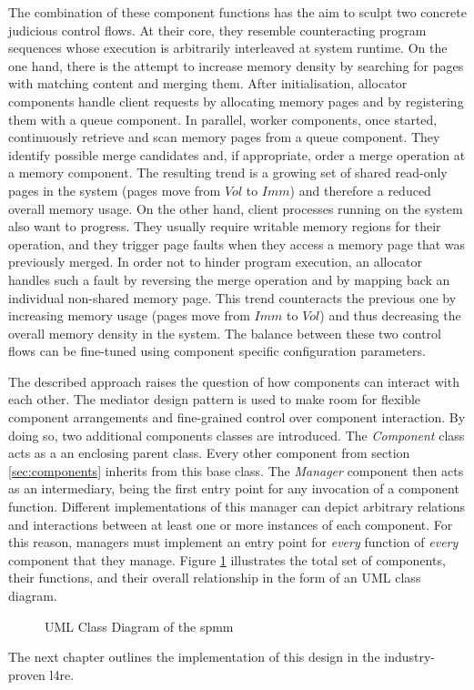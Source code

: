 The combination of these component functions has the aim to sculpt two concrete judicious control flows.
At their core, they resemble counteracting program sequences whose execution is arbitrarily interleaved at system runtime.
On the one hand, there is the attempt to increase memory density by searching for pages with matching content and merging them.
After initialisation, allocator components handle client requests by allocating memory pages and by registering them with a queue component.
In parallel, worker components, once started, continuously retrieve and scan memory pages from a queue component.
They identify possible merge candidates and, if appropriate, order a merge operation at a memory component.
The resulting trend is a growing set of shared read-only pages in the system (pages move from $Vol$ to $Imm$) and therefore a reduced overall memory usage.
On the other hand, client processes running on the system also want to progress.
They usually require writable memory regions for their operation, and they trigger page faults when they access a memory page that was previously merged.
In order not to hinder program execution, an allocator handles such a fault by reversing the merge operation and by mapping back an individual non-shared memory page.
This trend counteracts the previous one by increasing memory usage (pages move from $Imm$ to $Vol$) and thus decreasing the overall memory density in the system.
The balance between these two control flows can be fine-tuned using component specific configuration parameters.

The described approach raises the question of how components can interact with each other.
The mediator design pattern is used to make room for flexible component arrangements and fine-grained control over component interaction.
By doing so, two additional components classes are introduced.
The \emph{Component} class acts as a an enclosing parent class.
Every other component from section \ref{sec:components} inherits from this base class.
The \emph{Manager} component then acts as an intermediary, being the first entry point for any invocation of a component function.
Different implementations of this manager can depict arbitrary relations and interactions between at least one or more instances of each component.
For this reason, managers must implement an entry point for \emph{every} function of \emph{every} component that they manage.
Figure \ref{fig:umlcd} illustrates the total set of components, their functions, and their overall relationship in the form of an UML class diagram.

\begin{figure}
  \centering
  
  \caption{UML Class Diagram of the \acs{spmm}}
  \label{fig:umlcd}
\end{figure}

The next chapter outlines the implementation of this design in the industry-proven \acl{l4re}.
